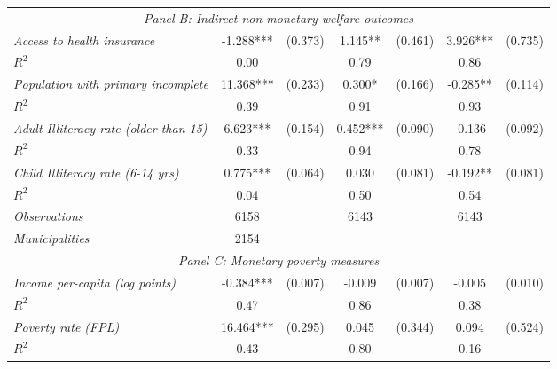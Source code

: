 \begin{tabular}{lcccccc}
\multicolumn{7}{c}{\textit{Panel B: Indirect non-monetary welfare outcomes}} \\
		
\textit{Access to health insurance}          &  -1.288***    & (0.373)      &   1.145**        &  (0.461)      &     3.926***  &    (0.735)   \\
$R^{2}$			           	   &  0.00   & 	   &     0.79   	&		 &     0.86   &  \\

\textit{Population with primary incomplete}          &  11.368***    & (0.233)      &   0.300*        &  (0.166)      &     -0.285**  &    (0.114)   \\
$R^{2}$			           	   &  0.39   & 	   &     0.91   	&		 &     0.93   &  \\
		
\textit{Adult Illiteracy rate (older than 15)}          &  6.623***    & (0.154)      &   0.452***        &  (0.090)      &     -0.136  &    (0.092)   \\
$R^{2}$			           	   &  0.33   & 	   &     0.94   	&		 &     0.78   &  \\

\textit{Child Illiteracy rate (6-14 yrs)}          &  0.775***    & (0.064)      &   0.030        &  (0.081)      &     -0.192**  &    (0.081)   \\
$R^{2}$			           	   &  0.04   & 	   &     0.50   	&		 &     0.54   &  \\


\textit{Observations}                 &   6158    &        & 6143    &  &  6143   &  		\\
\textit{Municipalities}               &   2154   &        &    &  &    &  		\\
\hline		

\multicolumn{7}{c}{\textit{Panel C: Monetary poverty measures}} \\


\textit{Income per-capita (log points)}          &  -0.384***    & (0.007)      &   -0.009        &  (0.007)      &     -0.005  &    (0.010)   \\
$R^{2}$			           	   &  0.47   & 	   &     0.86   	&		 &     0.38   &  \\

\textit{Poverty rate (FPL)}          &  16.464***    & (0.295)      &   0.045        &  (0.344)      &     0.094  &    (0.524)   \\
$R^{2}$			           	   &  0.43   & 	   &     0.80   	&		 &     0.16   &  \\
		

\end{tabular}

